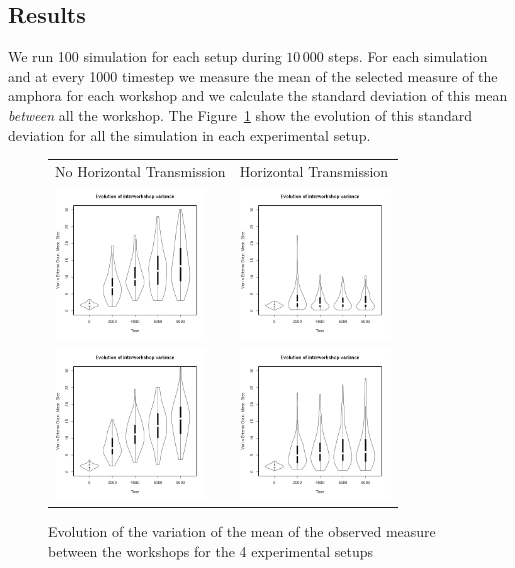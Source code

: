 \documentclass[a4paper]{article}
\begin{document}
\subsection{Results}
We run 100 simulation for each setup during $10\,000$ steps. For each simulation and at every 1000 timestep we measure the mean of the selected measure of the amphora for each workshop and we calculate the standard deviation of this mean \emph{between} all the workshop. The Figure~\ref{fig:resmod} show the evolution of  this standard deviation for all the simulation in each experimental setup.
    \begin{figure}[h!]
    \centering
	\begin{tabular}{m{4cm}m{4cm}}
	    {\tiny \hspace{.4cm}No Horizontal Transmission} & {\centering\tiny Horizontal Transmission }\\
	    \includegraphics[height=4cm]{images/lineNC.png}
	    &
	    \includegraphics[height=4cm]{images/lineC.png}\\
	    \includegraphics[height=4cm]{images/cubeNC.png}
	    &
	    \includegraphics[height=4cm]{images/cubeC.png}\\
	\end{tabular}
	\caption{Evolution of the variation of the mean of the observed measure between the workshops for the 4 experimental setups}
	\label{fig:resmod}
    \end{figure}
\end{document}
